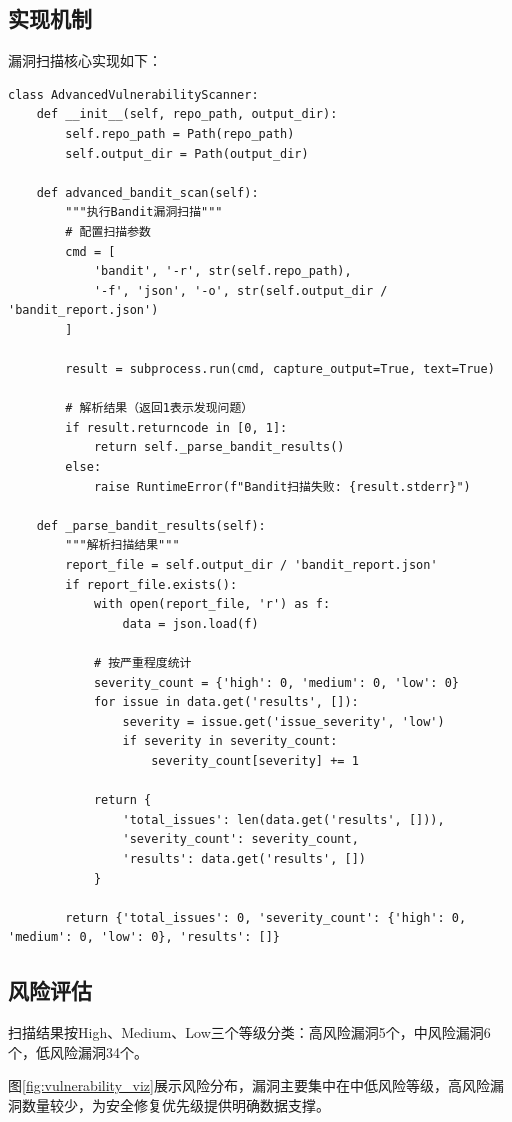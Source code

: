 \subsection{实现机制}
漏洞扫描核心实现如下：

\begin{verbatim}
class AdvancedVulnerabilityScanner:
    def __init__(self, repo_path, output_dir):
        self.repo_path = Path(repo_path)
        self.output_dir = Path(output_dir)

    def advanced_bandit_scan(self):
        """执行Bandit漏洞扫描"""
        # 配置扫描参数
        cmd = [
            'bandit', '-r', str(self.repo_path),
            '-f', 'json', '-o', str(self.output_dir / 'bandit_report.json')
        ]

        result = subprocess.run(cmd, capture_output=True, text=True)

        # 解析结果（返回1表示发现问题）
        if result.returncode in [0, 1]:
            return self._parse_bandit_results()
        else:
            raise RuntimeError(f"Bandit扫描失败: {result.stderr}")

    def _parse_bandit_results(self):
        """解析扫描结果"""
        report_file = self.output_dir / 'bandit_report.json'
        if report_file.exists():
            with open(report_file, 'r') as f:
                data = json.load(f)

            # 按严重程度统计
            severity_count = {'high': 0, 'medium': 0, 'low': 0}
            for issue in data.get('results', []):
                severity = issue.get('issue_severity', 'low')
                if severity in severity_count:
                    severity_count[severity] += 1

            return {
                'total_issues': len(data.get('results', [])),
                'severity_count': severity_count,
                'results': data.get('results', [])
            }

        return {'total_issues': 0, 'severity_count': {'high': 0, 'medium': 0, 'low': 0}, 'results': []}
\end{verbatim}

\subsection{风险评估}
扫描结果按High、Medium、Low三个等级分类：高风险漏洞5个，中风险漏洞6个，低风险漏洞34个。

图\ref{fig:vulnerability_viz}展示风险分布，漏洞主要集中在中低风险等级，高风险漏洞数量较少，为安全修复优先级提供明确数据支撑。

